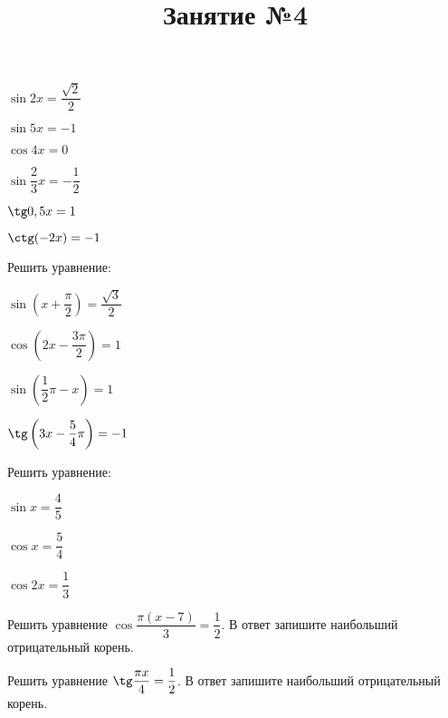 \begin{listofex}
\begin{enumcols}[itemcolumns=3]
		\item \( \sin 2x = \dfrac{\sqrt{2}}{2} \)
		\item \( \sin 5x = -1 \)
		\item \( \cos 4x = 0 \)
		\item \( \sin \dfrac{2}{3}x = -\dfrac{1}{2} \)
		\item \( \tg 0,5x = 1 \)
		\item \( \ctg (-2x) = -1 \)
	\end{enumcols}
	\item Решить уравнение:
	\begin{enumcols}[itemcolumns=2]
		\item \( \sin \left( x+\dfrac{\pi}{2} \right) = \dfrac{\sqrt{3}}{2} \)
		\item \( \cos \left( 2x-\dfrac{3\pi}{2} \right) = 1 \)
		\item \( \sin \left( \dfrac{1}{2}\pi-x \right)=1 \)
		\item \( \tg\left( 3x-\dfrac{5}{4}\pi \right)=-1 \)
	\end{enumcols}
	\item Решить уравнение:
	\begin{enumcols}[itemcolumns=3]
		\item \( \sin x = \dfrac{4}{5} \)
		\item \( \cos x = \dfrac{5}{4}\)
		\item \( \cos 2x = \dfrac{1}{3}\)
	\end{enumcols}
	\item Решить уравнение \( \cos\dfrac{\pi(x-7)}{3}=\dfrac{1}{2} \). В ответ запишите наибольший отрицательный корень.
	\item Решить уравнение \( \tg\dfrac{\pi x}{4}=\dfrac{1}{2} \). В ответ запишите наибольший отрицательный корень.
\end{listofex}
\newpage
\title{Занятие №4}
